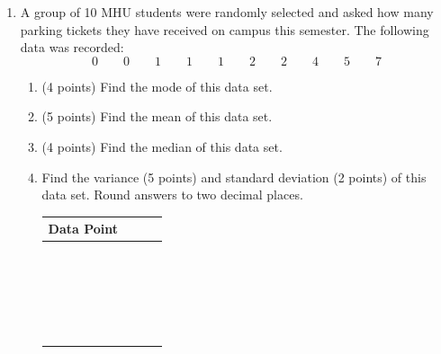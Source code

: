 \documentclass[12pt]{article}
\begin{document}
\begin{enumerate}
\newpage
\item
A group of 10 MHU students were randomly selected and asked how many parking tickets they have received on campus this semester.  The following data was recorded:
\[0\qquad0\qquad1\qquad1\qquad1\qquad2\qquad2\qquad4\qquad5\qquad7\]
\begin{enumerate}
\item (4 points) Find the mode of this data set.
\vspace{.5 in}
\item (5 points) Find the mean of this data set.
\vspace{1.0 in}
\item (4 points) Find the median of this data set.
\vspace{.5 in}
\item Find the variance (5 points) and standard deviation (2 points) of this data set.  Round answers to two decimal places.
\begin{center}
\begin{tabular}{|c|c|l|l|}
\hline
Data Point&\qquad\qquad\qquad\qquad &\qquad\qquad\qquad\qquad\\
 \hline
\qquad\qquad & \qquad\qquad & \qquad\qquad\\
&&\\
\hline
 & & \\
&&\\
\hline
 & & \\
&&\\
\hline
 & & \\
&&\\
\hline
 & & \\
&&\\
\hline
 & & \\
&&\\
 \hline
 & & \\
&&\\
 \hline
 & & \\
&&\\
 \hline
 & & \\
&&\\
 \hline
 & & \\
&&\\
 \hline
& & \\
&&\\
\hline
\end{tabular}
\end{center}

\end{enumerate}



\end{enumerate}
\end{document}
